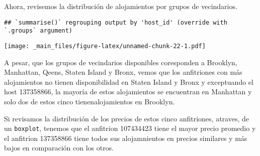 \documentclass[
]{book}
\newenvironment{Shaded}{\begin{snugshade}}{\end{snugshade}}
\newcommand{\AttributeTok}[1]{\textcolor[rgb]{0.77,0.63,0.00}{#1}}
\newcommand{\FunctionTok}[1]{\textcolor[rgb]{0.00,0.00,0.00}{#1}}
\newcommand{\NormalTok}[1]{#1}
\newcommand{\OtherTok}[1]{\textcolor[rgb]{0.56,0.35,0.01}{#1}}
\newcommand{\SpecialCharTok}[1]{\textcolor[rgb]{0.00,0.00,0.00}{#1}}
\newcommand{\StringTok}[1]{\textcolor[rgb]{0.31,0.60,0.02}{#1}}
\begin{document}
Ahora, revisemos la distribución de alojamientos por grupos de vecindarios.

\begin{Shaded}
\end{Shaded}

\begin{verbatim}
## `summarise()` regrouping output by 'host_id' (override with `.groups` argument)
\end{verbatim}

\texttt{[image: \_main\_files/figure-latex/unnamed-chunk-22-1.pdf]}

A pesar, que los grupos de vecindarios disponibles coresponden a Brooklyn, Manhattan, Qeens, Staten Island y Bronx, vemos que los anfitriones con más alojamientos no tienen disponibilidad en Staten Island y Bronx y exceptuando el host 137358866, la mayoría de estos alojamientos se encuentran en Manhattan y solo dos de estos cinco tienenalojamientos en Brooklyn.

Si revisamos la distribución de los precios de estos cinco anfitriones, atraves, de un \texttt{boxplot}, tenemos que el anfitrion 107434423 tiene el mayor precio promedio y el anfitrion 137358866 tiene todos sus alojamnientos en precios similares y más bajos en comparación con los otros.
\end{document}
